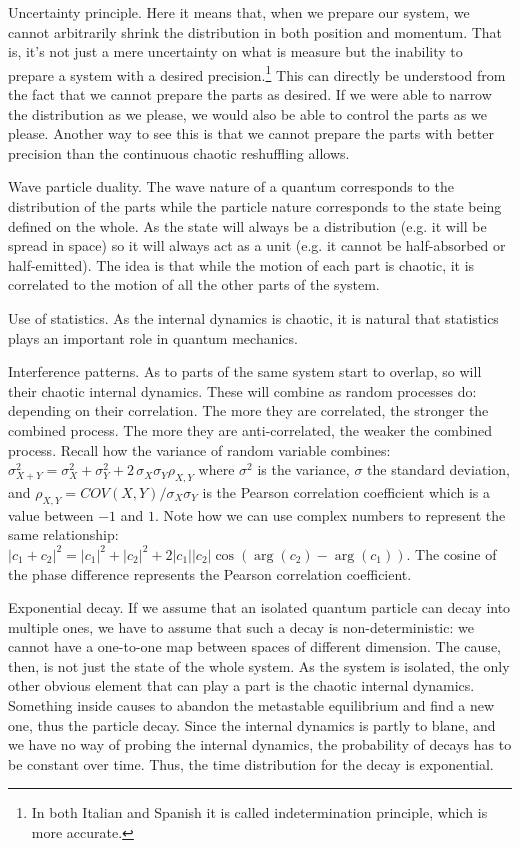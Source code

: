\documentclass[letterpaper]{article}
\theoremstyle{plain}%
\theoremstyle{definition}
\theoremstyle{remark}
\begin{document}
Uncertainty principle. Here it means that, when we prepare our system, we cannot arbitrarily shrink the distribution in both position and momentum. That is, it's not just a mere uncertainty on what is measure but the inability to prepare a system with a desired precision.\footnote{In both Italian and Spanish it is called indetermination principle, which is more accurate.} This can directly be understood from the fact that we cannot prepare the parts as desired. If we were able to narrow the distribution as we please, we would also be able to control the parts as we please. Another way to see this is that we cannot prepare the parts with better precision than the continuous chaotic reshuffling allows.

Wave particle duality. The wave nature of a quantum corresponds to the distribution of the parts while the particle nature corresponds to the state being defined on the whole. As the state will always be a distribution (e.g. it will be spread in space) so it will always act as a unit (e.g. it cannot be half-absorbed or half-emitted). The idea is that while the motion of each part is chaotic, it is correlated to the motion of all the other parts of the system.

Use of statistics. As the internal dynamics is chaotic, it is natural that statistics plays an important role in quantum mechanics.

Interference patterns. As to parts of the same system start to overlap, so will their chaotic internal dynamics. These will combine as random processes do: depending on their correlation. The more they are correlated, the stronger the combined process. The more they are anti-correlated, the weaker the combined process. Recall how the variance of random variable combines: $\sigma^2_{X+Y} = \sigma^2_{X} + \sigma^2_{Y} + 2 \, \sigma_{X} \sigma_{Y} \rho_{X,Y}$ where $\sigma^2$ is the variance, $\sigma$ the standard deviation, and $\rho_{X,Y}= COV(X,Y)/\sigma_{X}\sigma_{Y}$ is the Pearson correlation coefficient which is a value between $-1$ and $1$. Note how we can use complex numbers to represent the same relationship: $|c_1+c_2|^2=|c_1|^2 + |c_2|^2 + 2 |c_1||c_2|\cos(\arg(c_2) - \arg(c_1))$. The cosine of the phase difference represents the Pearson correlation coefficient.

Exponential decay. If we assume that an isolated quantum particle can decay into multiple ones, we have to assume that such a decay is non-deterministic: we cannot have a one-to-one map between spaces of different dimension. The cause, then, is not just the state of the whole system. As the system is isolated, the only other obvious element that can play a part is the chaotic internal dynamics. Something inside causes to abandon the metastable equilibrium and find a new one, thus the particle decay. Since the internal dynamics is partly to blane, and we have no way of probing the internal dynamics, the probability of decays has to be constant over time. Thus, the time distribution for the decay is exponential.
\end{document}

